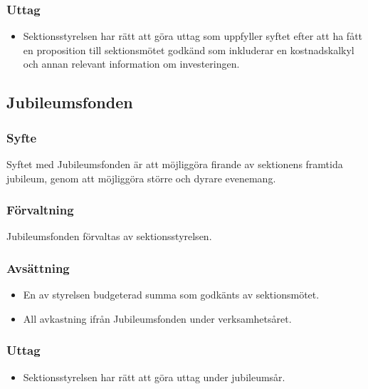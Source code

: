 \documentclass[a4paper, 10pt]{article}
\begin{document}
\subsubsection{Uttag}
\begin{itemize}
  \item Sektionsstyrelsen har rätt att göra uttag som uppfyller syftet efter att ha fått en proposition till sektionsmötet godkänd som inkluderar en kostnadskalkyl och annan relevant information om investeringen.
\end{itemize}
\subsection{Jubileumsfonden}
\subsubsection{Syfte}
\label{sec:jubileumfond_syfte}
Syftet med Jubileumsfonden är att möjliggöra firande av sektionens framtida jubileum, genom att möjliggöra större och dyrare evenemang.
\subsubsection{Förvaltning}
Jubileumsfonden förvaltas av sektionsstyrelsen.
\subsubsection{Avsättning}
\begin{itemize}
  \item En av styrelsen budgeterad summa som godkänts av sektionsmötet.
  \item All avkastning ifrån Jubileumsfonden under verksamhetsåret.
\end{itemize}
\subsubsection{Uttag}
\begin{itemize}
  \item Sektionsstyrelsen har rätt att göra uttag under jubileumsår.
\end{itemize}
\end{document}
